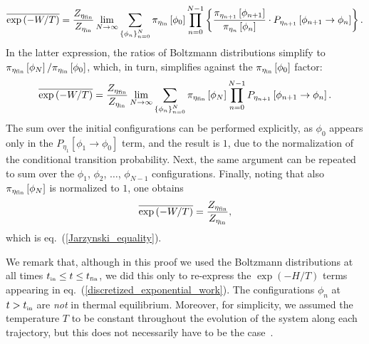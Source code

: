 \documentclass[11pt]{article}
\newcommand{\etain}{\eta_{\mbox{\tiny{in}}}}
\newcommand{\etafin}{\eta_{\mbox{\tiny{fin}}}}
\newcommand{\tin}{t_{\mbox{\tiny{in}}}}
\newcommand{\tfin}{t_{\mbox{\tiny{fin}}}}
\begin{document}
\begin{equation}
\label{simplified_discretized_exponential_work_pi_ratios}
\overline{\exp \left( -W/T \right)} = \frac{Z_{\etafin}}{Z_{\etain}} \lim_{N \to \infty} \sum_{\left\{ \phi_n \right\}_{n=0}^N }\pi_{\etain}\left[ \phi_0 \right] \prod_{n=0}^{N-1} \left\{\frac{\pi_{\eta_{n+1}}\left[\phi_{n+1}\right]}{\pi_{\eta_n}\left[\phi_n\right]} \cdot P_{\eta_{n+1}}\left[ \phi_{n+1} \to \phi_n \right] \right\}.
\end{equation}
In the latter expression, the ratios of Boltzmann distributions simplify to $\pi_{\etafin}\left[ \phi_N \right]/\pi_{\etain}\left[ \phi_0 \right]$, which, in turn, simplifies against the $\pi_{\etain}\left[ \phi_0 \right]$ factor:
\begin{equation}
\label{discretized_exponential_P_product}
\overline{\exp \left( -W/T \right)} = \frac{Z_{\etafin}}{Z_{\etain}}  \lim_{N \to \infty} \sum_{\left\{ \phi_n \right\}_{n=0}^N }\pi_{\etafin}\left[ \phi_N \right] \prod_{n=0}^{N-1} P_{\eta_{n+1}}\left[ \phi_{n+1} \to \phi_n \right].
\end{equation}
The sum over the initial configurations can be performed explicitly, as $\phi_0$ appears only in the $P_{\eta_1}\left[ \phi_1 \to \phi_0\right]$ term, and the result is $1$, due to the normalization of the conditional transition probability. Next, the same argument can be repeated to sum over the $\phi_1$, $\phi_2$, $\dots$, $\phi_{N-1}$ configurations. Finally, noting that also $\pi_{\etafin}\left[ \phi_N \right]$ is normalized to $1$, one obtains
\begin{equation}
\label{final_discretized_exponential_P_product}
\overline{\exp \left( -W/T \right)} = \frac{Z_{\etafin}}{Z_{\etain}},
\end{equation}
which is eq.~(\ref{Jarzynski_equality}).

We remark that, although in this proof we used the Boltzmann distributions at all times $\tin \le t \le \tfin$, we did this only to re-express the $\exp(-H/T)$ terms appearing in eq.~(\ref{discretized_exponential_work}). The configurations $\phi_n$ at $t > \tin$ are \emph{not} in thermal equilibrium. Moreover, for simplicity, we assumed the temperature $T$ to be constant throughout the evolution of the system along each trajectory, but this does not necessarily have to be the case~\cite{Chatelain:2007ts}.

%

\end{document}
